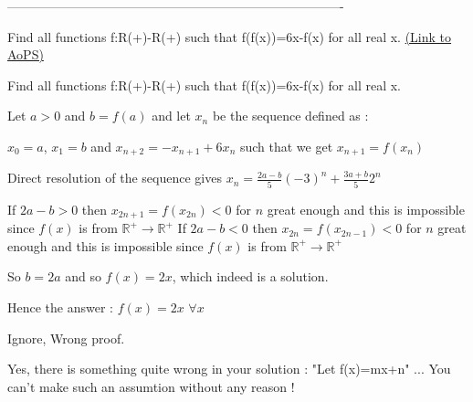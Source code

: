 -------------------------------------------------------------------------------

\begin{problem}
	Find all functions f:R(+)-R(+) such that f(f(x))=6x-f(x) for all real x.
	\flushright \href{https://artofproblemsolving.com/community/c6h336063}{(Link to AoPS)}
\end{problem}



\begin{solution}
	\begin{tcolorbox}Find all functions f:R(+)-R(+) such that f(f(x))=6x-f(x) for all real x.\end{tcolorbox}

Let $ a > 0$ and $ b = f(a)$ and let $ x_n$ be the sequence defined as :

$ x_0 = a$, $ x_1 = b$ and $ x_{n + 2} = - x_{n + 1} + 6x_n$ such that we get $ x_{n + 1} = f(x_n)$

Direct resolution of the sequence gives $ x_n = \frac {2a - b}5( - 3)^n + \frac {3a + b}52^n$

If $ 2a - b > 0$ then  $ x_{2n + 1} =f(x_{2n})  < 0$ for $ n$ great enough and this is impossible since $ f(x)$ is from $ \mathbb R^ + \to\mathbb R^ +$
If $ 2a - b < 0$ then  $ x_{2n}=f(x_{2n-1}) < 0$ for $ n$ great enough and this is impossible since $ f(x)$ is from $ \mathbb R^ + \to\mathbb R^ +$

So $ b = 2a$ and so $ f(x) = 2x$, which indeed is a solution.

Hence the answer : $ \boxed{f(x) = 2x}$ $ \forall x$
\end{solution}



\begin{solution}
	Ignore, Wrong proof.
\end{solution}



\begin{solution}
	Yes, there is something quite wrong in your solution : "Let f(x)=mx+n" ... You can't make such an assumtion without any reason !
\end{solution}




